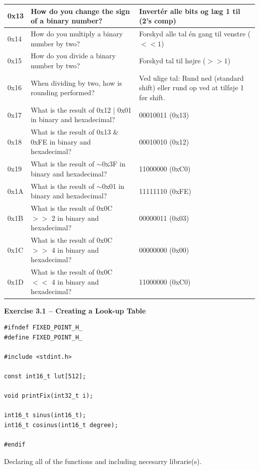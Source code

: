 \begin{tabularx}{\textwidth}{|l|X|X|}
0x13 & How do you change the sign of a binary number? & Invertér alle bits og læg 1 til (2's comp) \\ \hline
0x14 & How do you multiply a binary number by two? & Forskyd alle tal én gang til venstre ($<< 1$) \\ \hline
0x15 & How do you divide a binary number by two? & Forskyd tal til højre ($>> 1$) \\ \hline
0x16 & When dividing by two, how is rounding performed? & Ved ulige tal: Rund ned (standard shift) eller rund op ved at tilføje 1 før shift. \\ \hline
0x17 & What is the result of 0x12 | 0x01 in binary and hexadecimal? & 00010011 (0x13) \\ \hline
0x18 & What is the result of 0x13 \& 0xFE in binary and hexadecimal? & 00010010 (0x12) \\ \hline
0x19 & What is the result of $\sim$0x3F in binary and hexadecimal? & 11000000 (0xC0) \\ \hline
0x1A & What is the result of $\sim$0x01 in binary and hexadecimal? & 11111110 (0xFE) \\ \hline
0x1B & What is the result of 0x0C $>>$ 2 in binary and hexadecimal? & 00000011 (0x03) \\ \hline
0x1C & What is the result of 0x0C $>>$ 4 in binary and hexadecimal? & 00000000 (0x00) \\ \hline
0x1D & What is the result of 0x0C $<<$ 4 in binary and hexadecimal? & 11000000 (0xC0) \\ \hline
\end{tabularx}

\textbf{Exercise 3.1 – Creating a Look-up Table}

\begin{lstlisting}
#ifndef FIXED_POINT_H_
#define FIXED_POINT_H_

#include <stdint.h>

const int16_t lut[512];

void printFix(int32_t i);

int16_t sinus(int16_t);
int16_t cosinus(int16_t degree);

#endif
\end{lstlisting}

\vspace{-2em}

Declaring all of the functions and including necesarry librarie(s).

\vspace{1em}

